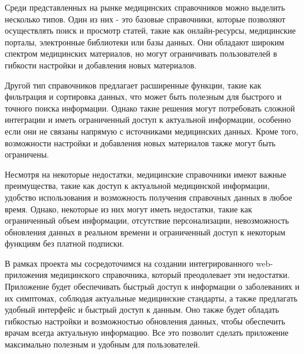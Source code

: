 Среди представленных на рынке медицинских справочников можно выделить несколько типов. Один из них - это базовые справочники, которые позволяют осуществлять поиск и просмотр статей, такие как онлайн-ресурсы, медицинские порталы, электронные библиотеки или базы данных. Они обладают широким спектром медицинских материалов, но могут ограничивать пользователей в гибкости настройки и добавления новых материалов.

Другой тип справочников предлагает расширенные функции, такие как фильтрация и сортировка данных, что может быть полезным для быстрого и точного поиска информации. Однако такие решения могут потребовать сложной интеграции и иметь ограниченный доступ к актуальной информации, особенно если они не связаны напрямую с источниками медицинских данных. Кроме того, возможности настройки и добавления новых материалов также могут быть ограничены.

Несмотря на некоторые недостатки, медицинские справочники имеют важные преимущества, такие как доступ к актуальной медицинской информации, удобство использования и возможность получения справочных данных в любое время. Однако, некоторые из них могут иметь недостатки, такие как ограниченный объем информации, отсутствие персонализации, невозможность обновления данных в реальном времени и ограниченный доступ к некоторым функциям без платной подписки.

В рамках проекта мы сосредоточимся на создании интегрированного web-приложения медицинского справочника, который преодолевает эти недостатки. Приложение будет обеспечивать быстрый доступ к информации о заболеваниях и их симптомах, соблюдая актуальные медицинские стандарты, а также предлагать удобный интерфейс и быстрый доступ к данным. Оно также будет обладать гибкостью настройки и возможностью обновления данных, чтобы обеспечить врачам всегда актуальную информацию. Все это позволит сделать приложение максимально полезным и удобным для пользователей.

